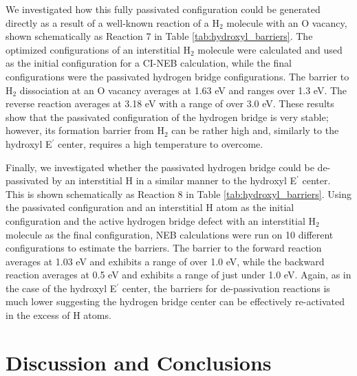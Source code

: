 \documentclass[aps,prb,reprint,superscriptaddress,showpacs]{revtex4-1}
\begin{document}
We investigated how this fully passivated configuration could be generated directly as a result of a well-known reaction of a H$_2$ molecule with an O vacancy, shown schematically as Reaction 7 in Table \ref{tab:hydroxyl_barriers}. The optimized configurations of an interstitial H$_2$ molecule were calculated and used as the initial configuration for a CI-NEB calculation, while the final configurations were the passivated hydrogen bridge configurations. The barrier to H$_2$ dissociation at an O vacancy averages at 1.63 eV and ranges over 1.3 eV. The reverse reaction averages at 3.18 eV with a range of over 3.0 eV. These results show that the passivated configuration of the hydrogen bridge is very stable; however, its formation barrier from H$_2$ can be rather high and, similarly to the hydroxyl E$^\prime$ center, requires a high temperature to overcome.

Finally, we investigated whether the passivated hydrogen bridge could be de-passivated by an interstitial H in a similar manner to the hydroxyl E$^\prime$ center. This is shown schematically as Reaction 8 in Table \ref{tab:hydroxyl_barriers}. Using the passivated configuration and an interstitial H atom as the initial configuration and the active hydrogen bridge defect with an interstitial H$_2$ molecule as the final configuration, NEB calculations were run on 10 different configurations to estimate the barriers. The barrier to the forward reaction averages at 1.03 eV and exhibits a range of over 1.0 eV, while the backward reaction averages at 0.5 eV and exhibits a range of just under 1.0 eV. Again, as in the case of the hydroxyl E$^\prime$ center, the barriers for de-passivation reactions is much lower suggesting the hydrogen bridge center can be effectively re-activated in the excess of H atoms.

\section{Discussion and Conclusions}
\end{document}
